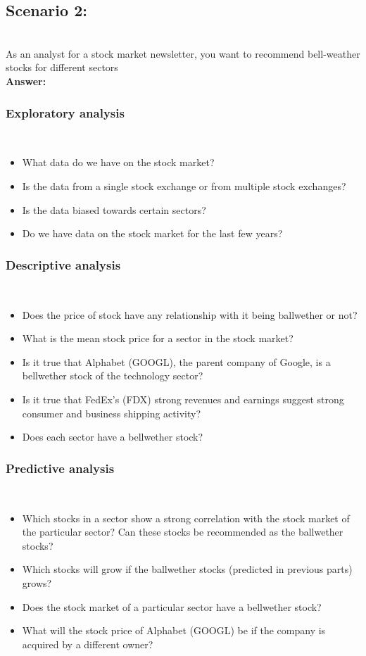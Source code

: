 \documentclass[12pt]{article}
\begin{document}
    \subsection*{Scenario 2:}\\
    As an analyst for a stock market newsletter, you want to recommend bell-weather stocks for different sectors\\
    \textbf{Answer:}
    \subsubsection*{Exploratory analysis}\\
    \begin{itemize}
        \item What data do we have on the stock market?
        \item Is the data from a single stock exchange or from multiple stock exchanges?
        \item Is the data biased towards certain sectors?
        \item Do we have data on the stock market for the last few years?
    \end{itemize}

    \subsubsection*{Descriptive analysis}\\
    \begin{itemize}
        \item Does the price of stock have any relationship with it being ballwether or not?
        \item What is the mean stock price for a sector in the stock market?
        \item Is it true that Alphabet (GOOGL), the parent company of Google, is a bellwether stock of the technology sector?
        \item Is it true that FedEx's (FDX) strong revenues and earnings suggest strong consumer and business shipping activity?
        \item Does each sector have a bellwether stock?
    \end{itemize}

    \subsubsection*{Predictive analysis}\\
    \begin{itemize}
        \item Which stocks in a sector show a strong correlation with the stock market of the particular sector? Can these stocks be recommended as the ballwether stocks?
        \item Which stocks will grow if the ballwether stocks (predicted in previous parts) grows?
        \item Does the stock market of a particular sector have a bellwether stock? 
        \item What will the stock price of Alphabet (GOOGL) be if the company is acquired by a different owner?
    \end{itemize}
    
\end{document}
